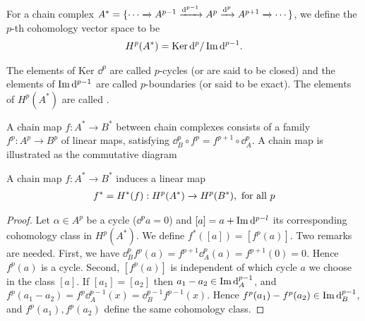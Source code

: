 \begin{definition}\label{def:4-2}
  For a chain complex $A^* = \{\cdots\xrightarrow[]{} A^{p-1}\xrightarrow[]{\mathrm{d}^{p-1}} A^p\xrightarrow[]{\mathrm{d}^p} A^{p+1}\xrightarrow[]{}\cdots\}$, we define
  the $p$-th cohomology vector space to be
  \begin{align*}
    H^p(A^*) = \operatorname{Ker}\mathrm{d}^p/\operatorname{Im}\mathrm{d}^{p-1}.
  \end{align*}

  The elements of Ker $\dd^p$ are called $p$-cycles (or are said to be closed) and the
  elements of $\operatorname{Im}\mathrm{d}^{p-1}$ are called $p$-boundaries (or said to be exact). The elements
  of $H^p(A^*)$ are called .

  A chain map $f:A^*\to B^*$ between chain complexes consists of a family $f^p: A^p\to B^p$ of linear maps, satisfying
  $\dd_B^p\circ f^p = f^{p+1}\circ\dd^p_A$. A chain map is illustrated as the commutative diagram


  \begin{center}
  \end{center}
\end{definition}

\begin{lemma}\label{lemma:4-3}
  A chain map $f:A^*\to B^*$ induces a linear map
  \begin{align*}
    f^* = H^*(f): H^p(A^*)\xrightarrow[]{} H^p(B^*), \text{ for all } p
  \end{align*}
\end{lemma}

\begin{proof}
  Let $\alpha\in A^p$ be a cycle ($\dd^pa = 0$) and $[a] = a + \operatorname{Im}\mathrm{d}^{p-l}$ its corresponding
  cohomology class in $H^p(A^*)$. We define $f^*([a]) = [f^p(a)]$. Two remarks are
  needed. First, we have $\dd^p_B f^p(a) = f^{p+1}\dd^p_A(a) = f^{p+1}(0) = 0$. Hence $f^p(a)$ is
  a cycle. Second, $[f^p(a)]$ is independent of which cycle $a$ we choose in the class
  $[a]$. If $[a_1] = [a_2]$ then $a_1-a_2\in\operatorname{Im}\mathrm{d}^{p-1}_A$, and $f^p(a_1-a_2) = f^p\dd^{p-1}_A(x)
    = \dd^{p-1}_Bf^{p-1}(x)$. Hence $f^p(a_1) - f^p(a_2) \in\operatorname{Im}\mathrm{d}^{p-1}_B$, and $f^p(a_1), f^p(a_2)$ define the
  same cohomology class.
\end{proof}

